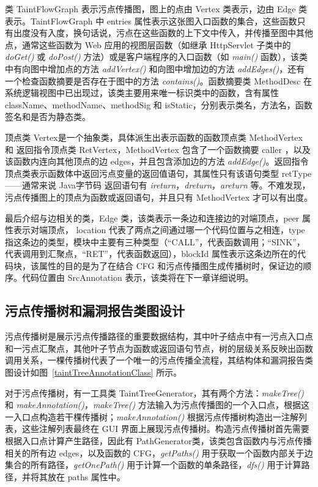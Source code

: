类 TaintFlowGraph 表示污点传播图，图上的点由 Vertex 类表示，边由 Edge 类表示。TaintFlowGraph 中 entries 属性表示这张图入口函数的集合，这些函数只有出度没有入度，换句话说，污点在这些函数的上下文中传入，并传播至图中其他点，通常这些函数为 Web 应用的视图层函数（如继承 HttpServlet 子类中的 \textit{doGet()} 或 \textit{doPost()} 方法）或是客户端程序的入口函数（如 \textit{main()} 函数），该类中有向图中增加点的方法 \textit{addVertex()} 和向图中增加边的方法 \textit{addEdges()}，还有一个检查函数摘要是否存在于图中的方法 \textit{contains()}。函数摘要类 MethodDesc 在系统逻辑视图中已出现过，该类主要用来唯一标识类中的函数，含有属性 className、methodName、methodSig 和 isStatic，分别表示类名，方法名，函数签名和是否为静态类。

顶点类 Vertex是一个抽象类，具体派生出表示函数的函数顶点类 MethodVertex 和 返回指令顶点类 RetVertex，MethodVertex 包含了一个函数摘要 caller ，以及该函数内连向其他顶点的边 edges，并且包含添加边的方法 \textit{addEdge()}。返回指令顶点类表示函数体中返回污点变量的返回值语句，其属性只有该语句类型 retType——通常来说 Java字节码 返回语句有 \textit{ireturn}，\textit{dreturn}，\textit{areturn} 等。不难发现，污点传播图上的顶点为函数或返回语句，并且只有 MethodVertex 才可以有出度。

最后介绍与边相关的类，Edge 类，该类表示一条边和连接边的对端顶点，peer 属性表示对端顶点， location 代表了两点之间通过哪一个代码位置与之相连，type 指这条边的类型，模块中主要有三种类型（“CALL”，代表函数调用；“SINK”，代表调用到汇聚点，“RET”，代表函数返回），blockId 属性表示这条边所在的代码块，该属性的目的是为了在结合 CFG 和污点传播图生成传播树时，保证边的顺序。代码位置由 SrcAnnotation  表示，该类将在下一章详细说明。

\subsection{污点传播树和漏洞报告类图设计}

污点传播树是展示污点传播路径的重要数据结构，其中叶子结点中有一污点入口点和一污点汇聚点，其他叶子节点为函数或返回语句节点，树的层级关系反映出函数调用关系，一棵传播树代表了一个唯一的污点传播全流程，其结构体和漏洞报告类图设计如图~\ref{taintTreeAnnotationClass} 所示。

对于污点传播树，有一工具类 TaintTreeGenerator，其有两个方法：\textit{makeTree()} 和 \textit{makeAnnotation()}，\textit{makeTree()} 方法输入为污点传播图的一个入口点，根据这一入口点构造若干棵传播树；\textit{makeAnnotation()} 根据污点传播树构造出一注解列表，这些注解列表最终在 GUI 界面上展现污点传播树。构造污点传播树首先需要根据入口点计算产生路径，因此有 PathGenerator类，该类包含函数内与污点传播相关的所有边 edges，以及函数的 CFG，\textit{getPaths()} 用于获取一个函数内部关于边集合的所有路径，\textit{getOnePath()} 用于计算一个函数的单条路径，\textit{dfs()} 用于计算路径，并将其放在 paths 属性中。

